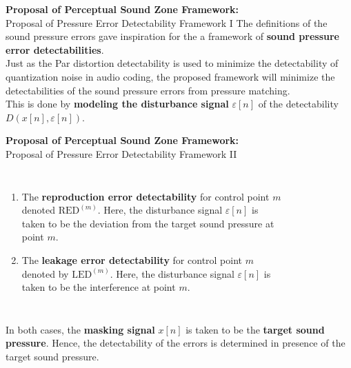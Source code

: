 \documentclass[aspectratio=169]{beamer}
\begin{document}
\begin{frame}{\textbf{Proposal of Perceptual Sound Zone Framework:}\\ Proposal of Pressure Error Detectability Framework I}
    The definitions of the sound pressure errors gave inspiration for the a framework of \textbf{sound pressure error detectabilities}.\\
    \vspace{10pt}
    Just as the Par distortion detectability is used to minimize the detectability of quantization noise in audio coding, 
    the proposed framework will minimize the detectabilities of the sound pressure errors from pressure matching.\\
    \vspace{10pt}
    This is done by \textbf{modeling the disturbance signal} $\varepsilon[n]$ of the detectability $D(x[n],\varepsilon[n])$.
\end{frame}

\begin{frame}{\textbf{Proposal of Perceptual Sound Zone Framework:}\\ Proposal of Pressure Error Detectability Framework II}
    \begin{columns}[c]
        \begin{enumerate}
        \item The \textbf{reproduction error detectability} for control point $m$ denoted $\text{RED}^{(m)}$. 
            Here, the disturbance signal $\varepsilon[n]$ is taken to be the deviation from the target sound pressure at point $m$.
        \item The \textbf{leakage error detectability} for control point $m$ denoted by $\text{LED}^{(m)}$. 
            Here, the disturbance signal $\varepsilon[n]$ is taken to be the interference at point $m$.
    \end{enumerate}
        \begin{figure}[]
            \centering
            \scalebox{0.7}{}
        \end{figure}
    \end{columns}
    \vspace{7pt}
    In both cases, the \textbf{masking signal} $x[n]$ is taken to be the \textbf{target sound pressure}.
    Hence, the detectability of the errors is determined in presence of the target sound pressure.
\end{frame}
\end{document}
